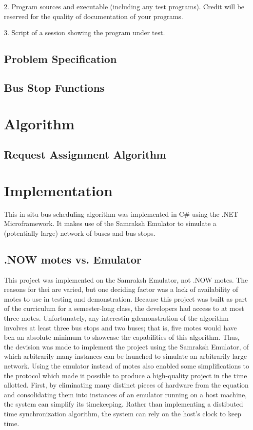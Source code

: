 \documentclass[runningheads]{llncs}
\begin{document}
2. Program sources and executable (including any test programs). Credit will be reserved for the quality of documentation of your programs.

3. Script of a session showing the program under test.

\subsection{Problem Specification}
\subsection{Bus Stop Functions}

\section{Algorithm}
\subsection{Request Assignment Algorithm}

\section{Implementation}
This in-situ bus scheduling algorithm was implemented in C\# using the .NET Microframework. It makes use of the Samraksh Emulator to simulate a (potentially large) network of buses and bus stops.

\subsection{.NOW motes vs. Emulator}
This project was implemented on the Samraksh Emulator, not .NOW motes. The reasons for thei are varied, but one deciding factor was a lack of availability of motes to use in testing and demonstration. Because this project was built as part of the curriculum for a semester-long class, the developers had access to at most three motes. Unfortunately, any interestin gdemonstration of the algorithm involves at least three bus stops and two buses; that is, five motes would have ben an absolute minimum to showcase the capabilities of this algorithm. Thus, the devision was made to implement the project using the Samraksh Emulator, of which arbitrarily many instances can be launched to simulate an arbitrarily large network. Using the emulator instead of motes also enabled some simplifications to the protocol which made it possible to produce a high-quality project in the time allotted.
First, by eliminating many distinct pieces of hardware from the equation and consolidating them into instances of an emulator running on a host machine, the system can simplify its timekeeping. Rather than implementing a distibuted time synchronization algorithm, the system can rely on the host's clock to keep time.
\end{document}
